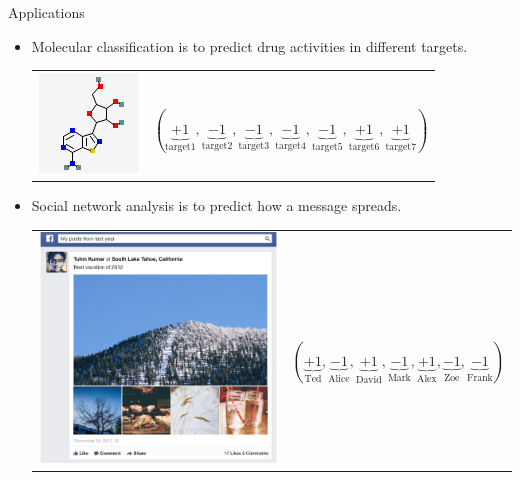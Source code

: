 \documentclass[first=dgreen,second=purple,logo=yellowexc]{aaltoslides}
\begin{document}
{\begin{frame}{Applications}
\begin{itemize}
\begin{tabular}{p{3cm}p{10cm}}
		& $(\underbrace{+1}_{\text{news}},\underbrace{+1}_{\text{economics}},\underbrace{-1}_{\text{sports}},\underbrace{-1}_{\text{politics}},\underbrace{-1}_{\text{movie}},\underbrace{-1}_{\text{science}},\underbrace{-1}_{\text{art}})$\\
        \end{tabular}
		\item Molecular classification is to predict drug activities in different targets.\\
		\begin{tabular}{p{3cm}p{10cm}} 
        \multirow{2}{*}{\includegraphics[scale = 0.4]{./figures/mol1.png}} & \\
		& $(\underbrace{+1}_{\text{target1}},\underbrace{-1}_{\text{target2}},\underbrace{-1}_{\text{target3}},\underbrace{-1}_{\text{target4}},\underbrace{-1}_{\text{target5}},\underbrace{+1}_{\text{target6}},\underbrace{+1}_{\text{target7}})$\\
        \end{tabular}
		\item Social network analysis is to predict how a message spreads.
		\begin{tabular}{p{3cm}p{10cm}} 
        \multirow{2}{*}{\includegraphics[scale = 0.08]{./figures/facebookvideo.png}} & \\
		& $(\underbrace{+1}_{\text{Ted}},\underbrace{-1}_{\text{Alice}},\underbrace{+1}_{\text{David}},\underbrace{-1}_{\text{Mark}},\underbrace{+1}_{\text{Alex}},\underbrace{-1}_{\text{Zoe}},\underbrace{-1}_{\text{Frank}})$\\
        \end{tabular}
	\end{itemize}
\end{frame}


}
\end{document}
